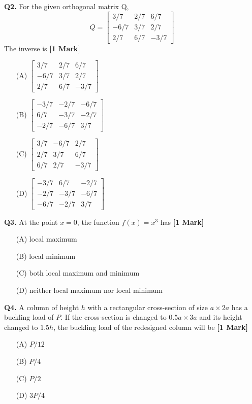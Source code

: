 \documentclass[11pt]{article}
\newcommand{\questiona}[2]{
    \noindent\textbf{Q#2.} #1 \hfill \textbf{[1 Mark]}
}
\begin{document}
\questiona{For the given orthogonal matrix Q,
\[ Q = \begin{bmatrix} 3/7 & 2/7 & 6/7 \\ -6/7 & 3/7 & 2/7 \\ 2/7 & 6/7 & -3/7 \end{bmatrix} \]
The inverse is}{2}
\begin{enumerate}
    \item[(A)] $\begin{bmatrix} 3/7 & 2/7 & 6/7 \\ -6/7 & 3/7 & 2/7 \\ 2/7 & 6/7 & -3/7 \end{bmatrix}$
    \item[(B)] $\begin{bmatrix} -3/7 & -2/7 & -6/7 \\ 6/7 & -3/7 & -2/7 \\ -2/7 & -6/7 & 3/7 \end{bmatrix}$
    \item[(C)] $\begin{bmatrix} 3/7 & -6/7 & 2/7 \\ 2/7 & 3/7 & 6/7 \\ 6/7 & 2/7 & -3/7 \end{bmatrix}$
    \item[(D)] $\begin{bmatrix} -3/7 & 6/7 & -2/7 \\ -2/7 & -3/7 & -6/7 \\ -6/7 & -2/7 & 3/7 \end{bmatrix}$
\end{enumerate}
\vspace{0.5cm}

\questiona{At the point \( x = 0 \), the function \( f(x) = x^3 \) has}{3}
\begin{enumerate}
    \item[(A)] local maximum
    \item[(B)] local minimum
    \item[(C)] both local maximum and minimum
    \item[(D)] neither local maximum nor local minimum
\end{enumerate}
\vspace{0.5cm}

\questiona{A column of height \( h \) with a rectangular cross-section of size \( a \times 2a \) has a buckling load of \( P \). If the cross-section is changed to \( 0.5a \times 3a \) and its height changed to \( 1.5h \), the buckling load of the redesigned column will be}{4}
\begin{enumerate}
    \item[(A)] \( P/12 \)
    \item[(B)] \( P/4 \)
    \item[(C)] \( P/2 \)
    \item[(D)] \( 3P/4 \)
\end{enumerate}
\vspace{0.5cm}
\end{document}
